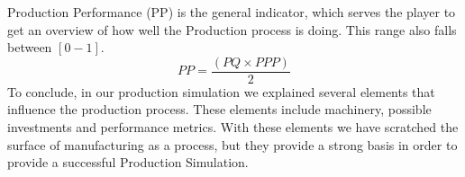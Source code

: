 Production Performance (PP) is the general indicator, which serves the player to get an overview of how well the Production process is doing. This range also falls between $[0-1]$. 
\begin{equation}
PP= \frac{(PQ\times PPP)}{2}
\label{eq:PP}
\end{equation}
To conclude, in our production simulation we explained several elements that influence the production process. These elements include machinery, possible investments and performance metrics. With these elements we have scratched the surface of manufacturing as a process, but they provide a strong basis in order to provide a successful Production Simulation. 